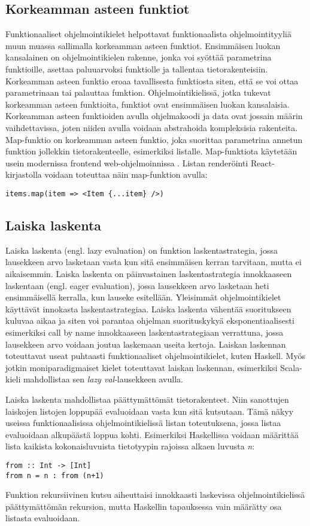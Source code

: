 \subsection{Korkeamman asteen funktiot}
Funktionaaliset ohjelmointikielet helpottavat funktionaalista ohjelmointityyliä muun muassa sallimalla korkeamman asteen
funktiot. Ensimmäisen luokan kansalainen on ohjelmointikielen rakenne, jonka voi syöttää parametrina funktioille,
asettaa paluuarvoksi funktiolle ja tallentaa tietorakenteisiin. Korkeamman asteen funktio eroaa tavallisesta funktiosta
siten, että se voi ottaa parametrinaan tai palauttaa funktion. Ohjelmointikielissä, jotka tukevat korkeamman asteen
funktioita, funktiot ovat ensimmäisen luokan kansalaisia. Korkeamman asteen funktioiden avulla ohjelmakoodi ja data ovat
jossain määrin vaihdettavissa, joten niiden avulla voidaan abstrahoida kompleksisia rakenteita. \cite{hudak} Map-funktio
on korkeamman asteen funktio, joka suorittaa parametrina annetun funktion jollekkin tietorakenteelle, esimerkiksi
listalle. Map-funktiota käytetään usein modernissa frontend web-ohjelmoinnissa \cite{functionalreact}. Listan
renderöinti React-kirjastolla voidaan toteuttaa näin map-funktion avulla:
\begin{verbatim}
items.map(item => <Item {...item} />)
\end{verbatim}

\subsection{Laiska laskenta}
Laiska laskenta (engl. lazy evaluation) on funktion laskentastrategia, jossa lausekkeen arvo lasketaan vasta kun sitä
ensimmäisen kerran tarvitaan, mutta ei aikaisemmin. Laiska laskenta on päinvastainen laskentastrategia innokkaaseen
laskentaan (engl. eager evaluation), jossa lausekkeen arvo lasketaan heti ensimmäisellä kerralla, kun lauseke
esitellään. Yleisimmät ohjelmointikielet käyttävät innokasta laskentastrategiaa. Laiska laskenta vähentää suoritukseen
kuluvaa aikaa ja siten voi parantaa ohjelman suorituskykyä eksponentiaalisesti esimerkiksi call by name innokkaaseen
laskentastrategiaan verrattuna, jossa lausekkeen arvo voidaan joutua laskemaan useita kertoja. Laiskan laskennan
toteuttavat useat puhtaasti funktionaaliset ohjelmointikielet, kuten Haskell. Myös jotkin moniparadigmaiset kielet
toteuttavat laiskan laskennan, esimerkiksi Scala-kieli mahdollistaa sen \textit{lazy val}-lausekkeen avulla.
\cite{languagedesign}

Laiska laskenta mahdollistaa päättymättömät tietorakenteet. Niin sanottujen laiskojen listojen loppupää evaluoidaan
vasta kun sitä kutsutaan. Tämä näkyy useissa funktionaalisissa ohjelmointikielissä listan toteutuksena, jossa listaa
evaluoidaan alkupäästä loppua kohti. Esimerkiksi Haskellissa voidaan määrittää lista kaikista kokonaisluvuista
tietotyypin rajoissa alkaen luvusta \textit{n}:
\begin{verbatim}
from :: Int -> [Int]
from n = n : from (n+1)
\end{verbatim}
Funktion rekursiivinen kutsu aiheuttaisi innokkaasti laskevissa ohjelmointikielissä päättymättömän rekursion, mutta
Haskellin tapauksessa vain määrätty osa listasta evaluoidaan. \cite{languagedesign}

